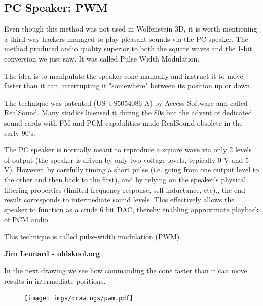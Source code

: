 \subsection{PC Speaker: PWM}
Even though this method was not used in Wolfenstein 3D, it is worth mentioning a third way hackers managed to play pleasant sounds via the PC speaker. The method produced audio quality superior to both the square waves and the 1-bit conversion we just saw. It was called Pulse Width Modulation.\\
\par
The idea is to manipulate the speaker cone manually and instruct it to move faster than it can, interrupting it "somewhere" between its position up or down.\\
\par
The technique was patented (US US5054086 A) by Access Software and called RealSound. Many studios licensed it during the 80s but the advent of dedicated sound cards with FM and PCM capabilities made RealSound obsolete in the early 90's.
\par
 \begin{fancyquotes}
  The PC speaker is normally meant to reproduce a square wave via only 2 levels of output (the speaker is driven by only two voltage levels, typically 0 V and 5 V). However, by carefully timing a short pulse (i.e. going from one output level to the other and then back to the first), and by relying on the speaker's physical filtering properties (limited frequency response, self-inductance, etc)., the end result corresponds to intermediate sound levels. This effectively allows the speaker to function as a crude 6 bit DAC, thereby enabling approximate playback of PCM audio.\\
  \par
  This technique is called pulse-width modulation (PWM).\\
  \par
  \textbf{Jim Leonard - oldskool.org}
 \end{fancyquotes}
\par
In the next drawing we see how commanding the cone faster than it can move results in intermediate positions.
\par
\begin{figure}[H]
  \centering
  \texttt{[image: imgs/drawings/pwm.pdf]}
  
\end{figure}
\par





